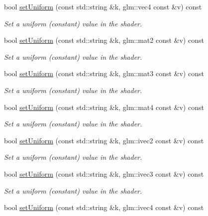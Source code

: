 \begin{DoxyCompactItemize}
bool \hyperlink{classgdl_1_1_a_shader_a2ce35c4336139492a98df3db8bdd18d1}{set\-Uniform} (const std\-::string \&k, glm\-::vec4 const \&v) const 
\begin{DoxyCompactList}\small\item\em Set a uniform (constant) value in the shader. \end{DoxyCompactList}\item 
bool \hyperlink{classgdl_1_1_a_shader_a183eb89b2c0f2dc8139c33ff406d7c07}{set\-Uniform} (const std\-::string \&k, glm\-::mat2 const \&v) const 
\begin{DoxyCompactList}\small\item\em Set a uniform (constant) value in the shader. \end{DoxyCompactList}\item 
bool \hyperlink{classgdl_1_1_a_shader_a727f81c327e4662d8ccc9d16d00d500b}{set\-Uniform} (const std\-::string \&k, glm\-::mat3 const \&v) const 
\begin{DoxyCompactList}\small\item\em Set a uniform (constant) value in the shader. \end{DoxyCompactList}\item 
bool \hyperlink{classgdl_1_1_a_shader_a16404bfe7fd48458b5938c1ce280a5b1}{set\-Uniform} (const std\-::string \&k, glm\-::mat4 const \&v) const 
\begin{DoxyCompactList}\small\item\em Set a uniform (constant) value in the shader. \end{DoxyCompactList}\item 
bool \hyperlink{classgdl_1_1_a_shader_abe10dffab7a6b3453281f4cb450b783e}{set\-Uniform} (const std\-::string \&k, glm\-::ivec2 const \&v) const 
\begin{DoxyCompactList}\small\item\em Set a uniform (constant) value in the shader. \end{DoxyCompactList}\item 
bool \hyperlink{classgdl_1_1_a_shader_af0e6f44857b1835c92a0b79606064ab5}{set\-Uniform} (const std\-::string \&k, glm\-::ivec3 const \&v) const 
\begin{DoxyCompactList}\small\item\em Set a uniform (constant) value in the shader. \end{DoxyCompactList}\item 
bool \hyperlink{classgdl_1_1_a_shader_aad8b08fc601c2409b3b670084a1e1a90}{set\-Uniform} (const std\-::string \&k, glm\-::ivec4 const \&v) const 

\end{DoxyCompactItemize}
